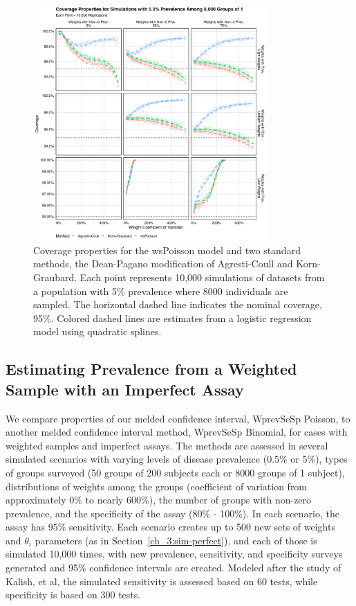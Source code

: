 \begin{figure}
\centering
\includegraphics[width=0.8\textwidth]{perfect_coverage_8000_groups_0_05_prev}
\caption{Coverage properties for the wsPoisson model and two standard methods, the Dean-Pagano modification of Agresti-Coull and Korn-Graubard.
Each point represents 10,000 simulations of datasets from a population with 5\% prevalence where 8000 individuals are sampled.
The horizontal dashed line indicates the nominal coverage, 95\%.
Colored dashed lines are estimates from a logistic regression model using quadratic splines.}
\label{ch_3:fig:perfect_coverage_8000_groups_0_05_prev}
\end{figure}


\subsection{Estimating Prevalence from a Weighted Sample with an Imperfect Assay}

We compare properties of our melded confidence interval, WprevSeSp Poisson, to another melded confidence interval method, WprevSeSp Binomial, for cases with weighted samples and imperfect assays.
The methods are assessed in several simulated scenarios with varying levels of disease prevalence (0.5\% or 5\%), types of groups surveyed (50 groups of 200 subjects each or 8000 groups of 1 subject), distributions of weights among the groups (coefficient of variation from approximately 0\% to nearly 600\%), the number of groups with non-zero prevalence, and the specificity of the assay (80\% - 100\%).
In each scenario, the assay has 95\% sensitivity.
Each scenario creates up to 500 new sets of weights and $\theta_i$ parameters (as in Section~\ref{ch_3:sim-perfect}), and each of those is simulated 10,000 times, with new prevalence, sensitivity, and specificity surveys generated and 95\% confidence intervals are created.
Modeled after the study of Kalish, et al,\cite{Kali:2021} the simulated sensitivity is assessed based on 60 tests, while specificity is based on 300 tests.


